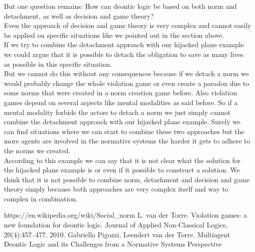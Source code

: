 \documentclass[conference]{hehe}
\begin{document}
But one question remains: How can deontic logic be based on both norm and detachment, as well as decision and game theory?\\
Even the approach of decision and game theory is very complex and cannot easily be applied on specific situations like we pointed out in the section above.\\
If we try to combine the detachment approach with our hijacked plane example we could argue that it is possible to detach the obligation to save as many lives as possible in this specific situation.\\
But we cannot do this without any consequences because if we detach a norm we would probably change the whole violation game or even create a paradox due to some norms that were created in a norm creation game before. Also violation games depend on several aspects like mental modalities as said before. So if a mental modality forbids the actors to detach a norm we just simply cannot combine the detachment approach with our hijacked plane example.
Surely we can find situations where we can start to combine these two approaches but the more agents are involved in the normative systems the harder it gets to adhere to the norms we created.\\
According to this example we can say that it is not clear what the solution for the hijacked plane example is or even if it possible to construct a solution. We think that it is not possible to combine norm, detachment and decision and game theory simply because both approaches are very complex itself and way to complex in combination.
\begin{thebibliography}{00}

 https://en.wikipedia.org/wiki/Social\_norm
 L. van der Torre. Violation games: a new foundation for deontic logic. Journal of
Applied Non-Classical Logics, 20(4):457–477, 2010.
 Gabriella Pigozzi, Leendert van der Torre. Multiagent Deontic Logic
and its Challenges
from a Normative Systems Perspective
\end{thebibliography}
\vspace{12pt}
\end{document}
